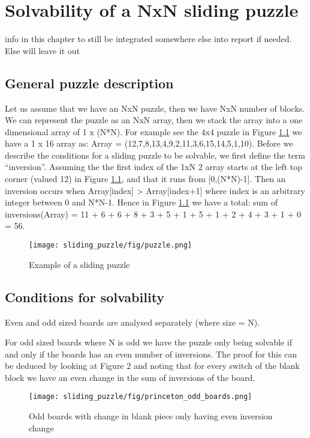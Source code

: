 \graphicspath{{sliding\_puzzle/fig}}
\chapter{Solvability of a NxN sliding puzzle}
\label{chap:Solvability of a NxN sliding puzzle}

{\color{red} \Huge{info in this chapter to still be integrated somewhere else into report if needed. Else will leave it out}}

\section{General puzzle description}
Let us assume that we have an NxN puzzle, then we have NxN number of blocks. We can represent the puzzle as an NxN array, then we stack the array into a one dimensional array of 1 x (N*N). For example see the 4x4 puzzle in Figure \ref{fig:sliding_puzzle} we have a 1 x 16 array as: 
Array = (12,7,8,13,4,9,2,11,3,6,15,14,5,1,10).
Before we describe the conditions for a sliding puzzle to be solvable, we first define the term “inversion”. Assuming the the first index of the 1xN 2 array starts at the left top corner (valued 12) in
Figure \ref{fig:sliding_puzzle}, and that it runs from [0,(N*N)-1]. Then an inversion occurs when Array[index] >
Array[index+1] where index is an arbitrary integer between 0 and N*N-1. Hence in Figure \ref{fig:sliding_puzzle} we have a
total: sum of inversions(Array) = 11 + 6 + 6 + 8 + 3 + 5 + 1 + 5 + 1 + 2 + 4 + 3 + 1 + 0 = 56.

\begin{figure}[!htb]
	\centering
	\texttt{[image: sliding\_puzzle/fig/puzzle.png]}
	\caption{Example of a sliding puzzle}
	\label{fig:sliding_puzzle}
\end{figure}

\section{Conditions for solvability}
Even and odd sized boards are analysed separately (where size = N).

For odd sized boards where N is odd we have the puzzle only being solvable if and only if the boards
has an even number of inversions. The proof for this can be deduced by looking at Figure 2 and noting that for every switch of the blank block we have an even change in the sum of inversions of the board. \cite{princeton_8puzzle_assignment}

\begin{figure}[!htb]
	\centering
	\texttt{[image: sliding\_puzzle/fig/princeton\_odd\_boards.png]}
	\caption{Odd boards with change in blank piece only having even inversion change \cite{princeton_8puzzle_assignment}}
	\label{fig:sol_odd_board}
\end{figure}

